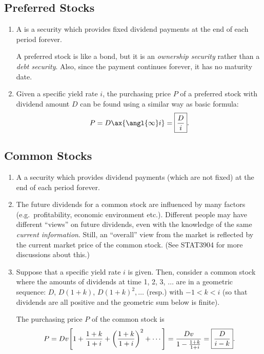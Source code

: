\subsection{Preferred Stocks}
\begin{enumerate}
\item A  is a security which provides fixed dividend
payments at the end of each period forever.

\begin{note}
A preferred stock is like a bond, but it is an \emph{ownership security} rather
than a \emph{debt security}. Also, since the payment continues forever, it has
no maturity date.
\end{note}

\item \label{it:pref-stock-price}
Given a specific yield rate \(i\), the purchasing price \(P\) of a preferred stock
with dividend amount \(D\) can be found using a similar way as basic formula:
\[
P=D\ax{\angl{\infty}i}=\boxed{\frac{D}{i}}.
\]
\end{enumerate}
\subsection{Common Stocks}
\begin{enumerate}
\item A  a security which provides dividend payments (which
are not fixed) at the end of each period forever.

\item The future dividends for a common stock are influenced by many factors
(e.g.\ profitability, economic environment etc.). Different people may have
different ``views'' on future dividends, even with the knowledge of the same
\emph{current information}. Still, an ``overall'' view from the market is
reflected by the current market price of the common stock. (See STAT3904 for
more discussions about this.)

\item \label{it:common-stock-price}
Suppose that a specific yield rate \(i\) is given. Then, consider a common
stock where the amounts of dividends at time 1, 2, 3, \(\dotsc\) are in a
geometric sequence: \(D\), \(D(1+k)\), \(D(1+k)^{2},\dotsc\) (resp.) with
\(-1<k<i\) (so that dividends are all positive and the geometric sum below is
finite).

The purchasing price \(P\) of the common stock is
\[
P=Dv\qty[1+\frac{1+k}{1+i}+\qty(\frac{1+k}{1+i})^{2}+\dotsb]
=\frac{Dv}{1-\frac{1+k}{1+i}}=\boxed{\frac{D}{i-k}}.
\]
\end{enumerate}
